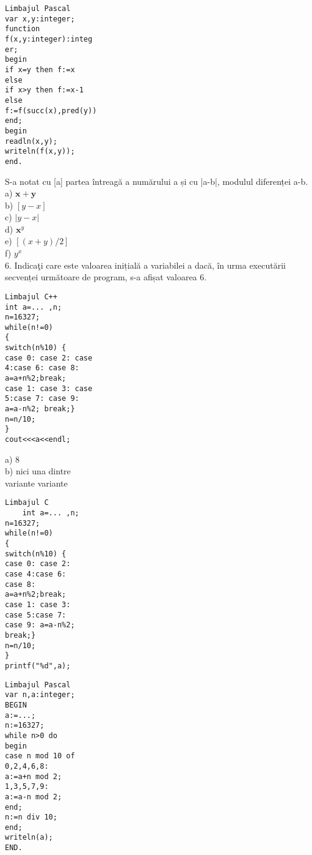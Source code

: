 \begin{verbatim}
Limbajul Pascal
var x,y:integer;
function
f(x,y:integer):integ
er;
begin
if x=y then f:=x
else
if x>y then f:=x-1
else
f:=f(succ(x),pred(y))
end;
begin
readln(x,y);
writeln(f(x,y));
end.
\end{verbatim}

S-a notat cu [a] partea întreagă a numărului a și cu |a-b|, modulul diferenței a-b.\\
a) $\mathbf{x}+\mathbf{y}$\\
b) $[y-x]$\\
c) $|y-x|$\\
d) $\mathbf{x}^{y}$\\
e) $[(x+y) / 2]$\\
f) $y^{x}$\\
6. Indicaţi care este valoarea inițială a variabilei a dacă, în urma executării secvenței următoare de program, s-a afișat valoarea 6.

\begin{verbatim}
Limbajul C++
int a=... ,n;
n=16327;
while(n!=0)
{
switch(n%10) {
case 0: case 2: case
4:case 6: case 8:
a=a+n%2;break;
case 1: case 3: case
5:case 7: case 9:
a=a-n%2; break;}
n=n/10;
}
cout<<<a<<endl;
\end{verbatim}

a) 8\\
b) nici una dintre\\
variante variante

\begin{verbatim}
Limbajul C
    int a=... ,n;
n=16327;
while(n!=0)
{
switch(n%10) {
case 0: case 2:
case 4:case 6:
case 8:
a=a+n%2;break;
case 1: case 3:
case 5:case 7:
case 9: a=a-n%2;
break;}
n=n/10;
}
printf("%d",a);
\end{verbatim}

\begin{verbatim}
Limbajul Pascal
var n,a:integer;
BEGIN
a:=...;
n:=16327;
while n>0 do
begin
case n mod 10 of
0,2,4,6,8:
a:=a+n mod 2;
1,3,5,7,9:
a:=a-n mod 2;
end;
n:=n div 10;
end;
writeln(a);
END.
\end{verbatim}

